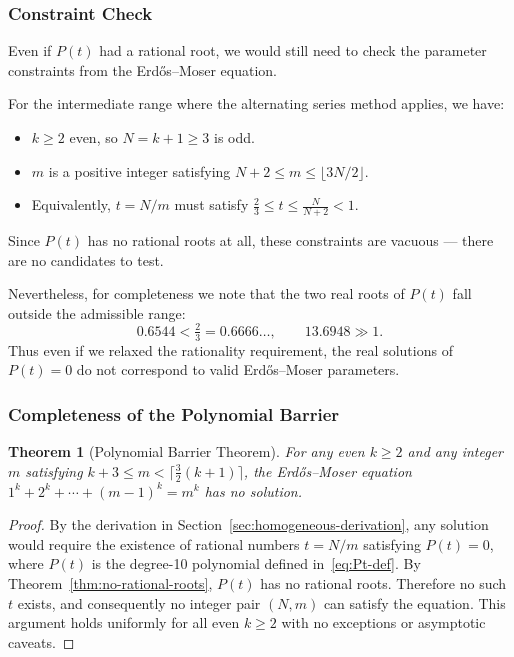 \documentclass[12pt,a4paper]{article}
\theoremstyle{plain}
\newtheorem{theorem}{Theorem}[section]
\theoremstyle{definition}
\begin{document}
\subsubsection{Constraint Check}
\label{sec:constraint-check}

Even if $P(t)$ had a rational root, we would still need to check
the parameter constraints from the Erd\H{o}s--Moser equation.

For the intermediate range where the alternating series method
applies, we have:
\begin{itemize}
  \item $k \ge 2$ even, so $N = k+1 \ge 3$ is odd.
  \item $m$ is a positive integer satisfying
        $N+2 \le m \le \lfloor 3N/2 \rfloor$.
  \item Equivalently, $t = N/m$ must satisfy
        $\tfrac{2}{3} \le t \le \tfrac{N}{N+2} < 1$.
\end{itemize}

Since $P(t)$ has no rational roots at all, these constraints are
vacuous --- there are no candidates to test.

Nevertheless, for completeness we note that the two real roots of
$P(t)$ fall outside the admissible range:
\[
  0.6544 < \tfrac{2}{3} = 0.6666\ldots, \qquad
  13.6948 \gg 1.
\]
Thus even if we relaxed the rationality requirement, the real
solutions of $P(t)=0$ do not correspond to valid
Erd\H{o}s--Moser parameters.

\subsubsection{Completeness of the Polynomial Barrier}
\label{sec:polynomial-completeness}

\begin{theorem}[Polynomial Barrier Theorem]\label{thm:poly-barrier}
  For any even $k \ge 2$ and any integer $m$ satisfying
  $k+3 \le m < \lceil\frac{3}{2}(k+1)\rceil$, the Erd\H{o}s--Moser
  equation $1^k + 2^k + \cdots + (m-1)^k = m^k$ has no solution.
\end{theorem}

\begin{proof}
  By the derivation in Section~\ref{sec:homogeneous-derivation},
  any solution would require the existence of rational numbers
  $t = N/m$ satisfying $P(t) = 0$, where $P(t)$ is the degree-10
  polynomial defined in~\eqref{eq:Pt-def}.  By Theorem~\ref{thm:no-rational-roots},
  $P(t)$ has no rational roots.  Therefore no such $t$ exists,
  and consequently no integer pair $(N,m)$ can satisfy the equation.
  This argument holds uniformly for all even $k \ge 2$ with no
  exceptions or asymptotic caveats.
\end{proof}
\end{document}
